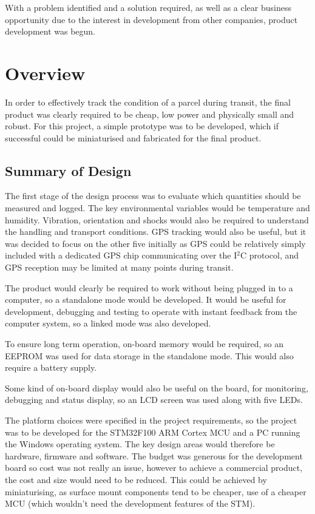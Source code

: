 \documentclass[a4paper,10pt]{article}  %
\begin{document}
With a problem identified and a solution required, as well as a clear
business opportunity due to the interest in development from other
companies, product development was begun.

\section{Overview}
\label{sec:overview}

In order to effectively track the condition of a parcel during
transit, the final product was clearly required to be cheap, low power
and physically small and robust. For this project, a simple prototype
was to be developed, which if successful could be miniaturised and
fabricated for the final product.

\subsection{Summary of Design}
\label{sec:summary-design}

The first stage of the design process was to evaluate which quantities
should be measured and logged. The key environmental variables would
be temperature and humidity. Vibration, orientation and shocks would
also be required to understand the handling and transport
conditions. GPS tracking would also be useful, but it was decided to
focus on the other five initially as GPS could be relatively simply
included with a dedicated GPS chip communicating over the I$^2$C
protocol, and GPS reception may be limited at many points during
transit.

The product would clearly be required to work without being plugged in
to a computer, so a standalone mode would be developed. It would be
useful for development, debugging and testing to operate with instant
feedback from the computer system, so a linked mode was also
developed.

To ensure long term operation, on-board memory would be required, so an
EEPROM was used for data storage in the standalone mode. This would
also require a battery supply.

Some kind of on-board display would also be useful on the board, for
monitoring, debugging and status display, so an LCD screen was used
along with five LEDs.

The platform choices were specified in the project requirements, so
the project was to be developed for the STM32F100 ARM Cortex MCU and a
PC running the Windows operating system. The key design areas would
therefore be hardware, firmware and software. The budget was generous
for the development board so cost was not really an issue, however to
achieve a commercial product, the cost and size would need to be
reduced. This could be achieved by miniaturising, as surface mount
components tend to be cheaper, use of a cheaper MCU (which wouldn't
need the development features of the STM).
\end{document}
